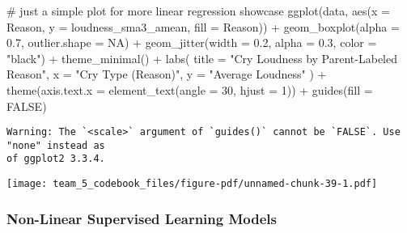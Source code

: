 \documentclass[
  letterpaper,
  DIV=11,
  numbers=noendperiod]{scrartcl}
\newenvironment{Shaded}{\begin{snugshade}}{\end{snugshade}}
\newcommand{\AttributeTok}[1]{\textcolor[rgb]{0.40,0.45,0.13}{#1}}
\newcommand{\CommentTok}[1]{\textcolor[rgb]{0.37,0.37,0.37}{#1}}
\newcommand{\ConstantTok}[1]{\textcolor[rgb]{0.56,0.35,0.01}{#1}}
\newcommand{\DecValTok}[1]{\textcolor[rgb]{0.68,0.00,0.00}{#1}}
\newcommand{\FloatTok}[1]{\textcolor[rgb]{0.68,0.00,0.00}{#1}}
\newcommand{\FunctionTok}[1]{\textcolor[rgb]{0.28,0.35,0.67}{#1}}
\newcommand{\NormalTok}[1]{\textcolor[rgb]{0.00,0.23,0.31}{#1}}
\newcommand{\SpecialCharTok}[1]{\textcolor[rgb]{0.37,0.37,0.37}{#1}}
\newcommand{\StringTok}[1]{\textcolor[rgb]{0.13,0.47,0.30}{#1}}
\begin{document}
\begin{Shaded}
\begin{Highlighting}[]
\CommentTok{\# just a simple plot for more linear regression showcase}
\FunctionTok{ggplot}\NormalTok{(data, }\FunctionTok{aes}\NormalTok{(}\AttributeTok{x =}\NormalTok{ Reason, }\AttributeTok{y =}\NormalTok{ loudness\_sma3\_amean, }\AttributeTok{fill =}\NormalTok{ Reason)) }\SpecialCharTok{+}
  \FunctionTok{geom\_boxplot}\NormalTok{(}\AttributeTok{alpha =} \FloatTok{0.7}\NormalTok{, }\AttributeTok{outlier.shape =} \ConstantTok{NA}\NormalTok{) }\SpecialCharTok{+}
  \FunctionTok{geom\_jitter}\NormalTok{(}\AttributeTok{width =} \FloatTok{0.2}\NormalTok{, }\AttributeTok{alpha =} \FloatTok{0.3}\NormalTok{, }\AttributeTok{color =} \StringTok{"black"}\NormalTok{) }\SpecialCharTok{+}
  \FunctionTok{theme\_minimal}\NormalTok{() }\SpecialCharTok{+}
  \FunctionTok{labs}\NormalTok{(}
    \AttributeTok{title =} \StringTok{"Cry Loudness by Parent{-}Labeled Reason"}\NormalTok{,}
    \AttributeTok{x =} \StringTok{"Cry Type (Reason)"}\NormalTok{,}
    \AttributeTok{y =} \StringTok{"Average Loudness"}
\NormalTok{  ) }\SpecialCharTok{+}
  \FunctionTok{theme}\NormalTok{(}\AttributeTok{axis.text.x =} \FunctionTok{element\_text}\NormalTok{(}\AttributeTok{angle =} \DecValTok{30}\NormalTok{, }\AttributeTok{hjust =} \DecValTok{1}\NormalTok{)) }\SpecialCharTok{+}
  \FunctionTok{guides}\NormalTok{(}\AttributeTok{fill =} \ConstantTok{FALSE}\NormalTok{)}
\end{Highlighting}
\end{Shaded}

\begin{verbatim}
Warning: The `<scale>` argument of `guides()` cannot be `FALSE`. Use "none" instead as
of ggplot2 3.3.4.
\end{verbatim}

\begin{center}
\texttt{[image: team\_5\_codebook\_files/figure-pdf/unnamed-chunk-39-1.pdf]}
\end{center}

\subsubsection{Non-Linear Supervised Learning
Models}\label{non-linear-supervised-learning-models}
\end{document}
